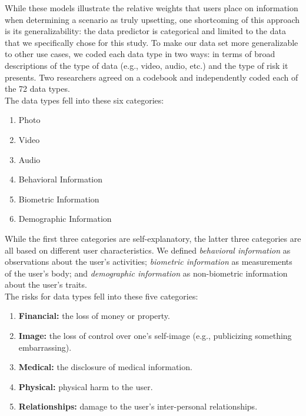 \documentclass[conference]{IEEEtran}
\begin{document}
While these models illustrate the relative weights that users place on information when determining a scenario as truly upsetting, one shortcoming of this approach is its generalizability: the data predictor is categorical and limited to the data that we specifically chose for this study. To make our data set more generalizable to other use cases, we coded each data type in two ways: in terms of broad descriptions of the type of data (e.g., video, audio, etc.) and the type of risk it presents. Two researchers agreed on a codebook and independently coded each of the 72 data types.\\

The data types fell into these six categories:

\begin{enumerate}[topsep=0pt,itemsep=-1ex,partopsep=1ex,parsep=1ex]
\item Photo
\item Video
\item Audio
\item Behavioral Information
\item Biometric Information
\item Demographic Information
\end{enumerate}

While the first three categories are self-explanatory, the latter three categories are all based on different user characteristics. We defined {\it behavioral information} as observations about the user's activities; {\it biometric information} as measurements of the user's body; and {\it demographic information} as non-biometric information about the user's traits. \\

The risks for data types fell into these five categories:

\begin{enumerate}[topsep=0pt,itemsep=-1ex,partopsep=1ex,parsep=1ex]
\item {\bf Financial:} the loss of money or property.
\item {\bf Image:} the loss of control over one's self-image (e.g., publicizing something embarrassing).
\item {\bf Medical:} the disclosure of medical information.
\item {\bf Physical:} physical harm to the user.
\item {\bf Relationships:} damage to the user's inter-personal relationships.
\end{enumerate}
\end{document}
